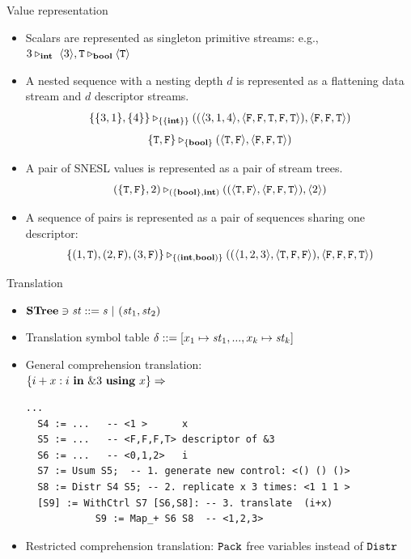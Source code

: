 \documentclass{beamer}
\begin{document}
\begin{frame}{Value representation}
\begin{itemize}
	\item Scalars are represented as singleton primitive streams: e.g., $3 \tr_\int \ \< 3 \'>, \T \tr_\bool \oT $
	
	\item A nested sequence with a nesting depth $d$ is represented as a flattening data stream and $d$ descriptor streams. 
	$$\{\{3,1\}, \{4\}\} \tr_{\{\{\int\}\}} ((\< 3,1,4 \'>, \<\F,\F,\T,\F,\T \'>),\< \F, \F, \T \'>)  $$
	$$\{\T,\F\} \tr_{\{\bool\}} (\< \T,\F\'>, \< \F,\F , \T \'>) $$		
	
\item A pair of SNESL values is represented as a pair of stream trees.  
	$$(\{\T,\F\},2) \tr_{(\{\bool\},\int)} ((\< \T, \F \'>, \< \F,\F,\T \'>),\singl{2})$$

\item A sequence of pairs is represented as a pair of sequences sharing one descriptor:
	$$\{(1,\T),(2,\F),(3,\F)\} \tr_{\{(\int,\bool)\}} ((\<1,2,3\'>, \<\T,\F, \F\'>), \< \F,\F,\F,\T \'>)$$
\end{itemize}
\end{frame}


\begin{frame}[fragile]{Translation}
\begin{itemize}
	\item $\STree \ni \st ::= \s \ | \ (\st_1,\st_2) $
	\item Translation symbol table $\del ::= [x_1 \|-> \st_1,..., x_k \|-> {\st_k}] $
	\item General comprehension translation:\\
	$\{i+x : i \ \mathbf{in} \ \&3 \ \mathbf{using} \ x\} \Rightarrow$  
{\footnotesize
	\begin{lstlisting}[style=svcode-style]
  ...
  S4 := ...   -- <1 >      x
  S5 := ...   -- <F,F,F,T> descriptor of &3 
  S6 := ...   -- <0,1,2>   i
  S7 := Usum S5;  -- 1. generate new control: <() () ()>
  S8 := Distr S4 S5; -- 2. replicate x 3 times: <1 1 1 >
  [S9] := WithCtrl S7 [S6,S8]: -- 3. translate  (i+x)
            S9 := Map_+ S6 S8  -- <1,2,3>
\end{lstlisting}
}
	\item Restricted comprehension translation: $\mathtt{Pack}$ free variables instead of $\mathtt{Distr}$ 
\end{itemize}
\end{frame}
\end{document}
